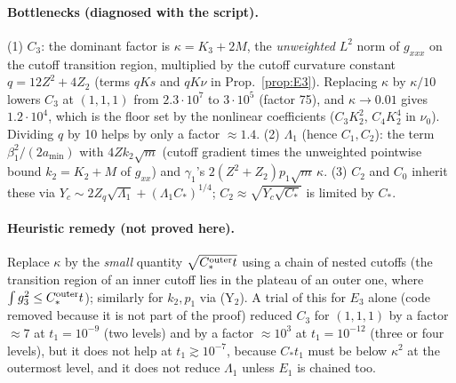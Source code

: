 \documentclass[11pt]{article}
\theoremstyle{remark}\newtheorem{remark}[theorem]{Remark}
\begin{document}
\paragraph{Bottlenecks (diagnosed with the script).} (1) $C_3$: the dominant factor is $\kappa=K_3+2M$, the \emph{unweighted} $L^2$ norm of $g_{xxx}$ on the cutoff transition region, multiplied by the cutoff curvature constant $q=12Z^2+4Z_2$ (terms $qKs$ and $qK\nu$ in Prop.~\ref{prop:E3}). Replacing $\kappa$ by $\kappa/10$ lowers $C_3$ at $(1,1,1)$ from $2.3\cdot10^7$ to $3\cdot10^5$ (factor 75), and $\kappa\to0.01$ gives $1.2\cdot10^4$, which is the floor set by the nonlinear coefficients ($C_3K_2^2$, $C_4K_2^4$ in $\nu_0$). Dividing $q$ by 10 helps by only a factor $\approx1.4$. (2) $\Lambda_1$ (hence $C_1,C_2$): the term $\beta_1^2/(2a_{\min})$ with $4Zk_2\sqrt m$ (cutoff gradient times the unweighted pointwise bound $k_2=K_2+M$ of $g_{xx}$) and $\gamma_1$'s $2(Z^2+Z_2)p_1\sqrt m\,\kappa$. (3) $C_2$ and $C_0$ inherit these via $Y_c\sim2Z_q\sqrt{\Lambda_1}+(\Lambda_1C_*)^{1/4}$; $C_2\approx\sqrt{Y_c\sqrt{C_*}}$ is limited by $C_*$.

\paragraph{Heuristic remedy (not proved here).} Replace $\kappa$ by the \emph{small} quantity $\sqrt{C_*^{\rm outer}t}$ using a chain of nested cutoffs (the transition region of an inner cutoff lies in the plateau of an outer one, where $\int g_3^2\le C_*^{\rm outer}t$); similarly for $k_2,p_1$ via (Y$_2$). A trial of this for $E_3$ alone (code removed because it is not part of the proof) reduced $C_3$ for $(1,1,1)$ by a factor $\approx7$ at $t_1=10^{-9}$ (two levels) and by a factor $\approx10^{3}$ at $t_1=10^{-12}$ (three or four levels), but it does not help at $t_1\gtrsim10^{-7}$, because $C_*t_1$ must be below $\kappa^2$ at the outermost level, and it does not reduce $\Lambda_1$ unless $E_1$ is chained too.

\appendix
\end{document}
